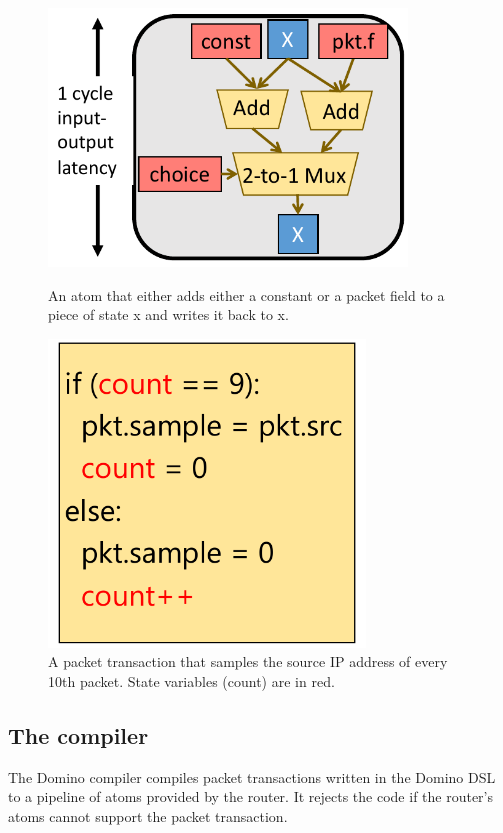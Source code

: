 \begin{figure}[!t]
\begin{minipage}{0.48\textwidth}
\centering
\vspace{0.38in}
\includegraphics[width=0.85\textwidth]{atom.pdf}
\caption{An atom that either adds either a constant or a packet field to a
piece of state x and writes it back to x.}
\label{fig:simple_atom}
\end{minipage}
\hfill
\begin{minipage}{0.48\textwidth}
\centering
\includegraphics[width=0.75\textwidth]{packet_transaction.pdf}
\caption{A packet transaction that samples the source IP address of every 10th
packet. State variables (count) are in red.}
\label{fig:simple_transaction}
\end{minipage}
\end{figure}

\subsection{The compiler} The Domino compiler compiles packet transactions
written in the Domino DSL to a pipeline of atoms provided by the router. It
rejects the code if the router's atoms cannot support the packet transaction.

